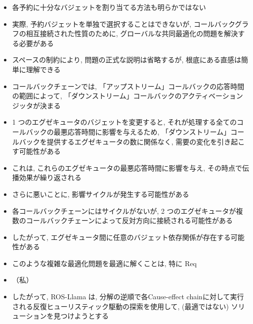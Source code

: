 \begin{frame}{}
    \begin{itemize}
        \item 各予約に十分なバジェットを割り当てる方法も明らかではない
\item 実際, 予約バジェットを単独で選択することはできないが, コールバックグラフの相互接続された性質のために, グローバルな共同最適化の問題を解決する必要がある
\item スペースの制約により, 問題の正式な説明は省略するが, 根底にある直感は簡単に理解できる
\item コールバックチェーンでは, 「アップストリーム」コールバックの応答時間の範囲によって, 「ダウンストリーム」コールバックのアクティベーションジッタが決まる
    \end{itemize}
\end{frame}

\begin{frame}{}
    \begin{itemize}
        \item 1 つのエグゼキュータのバジェットを変更すると, それが処理する全てのコールバックの最悪応答時間に影響を与えるため, 「ダウンストリーム」コールバックを提供するエグゼキュータの数に関係なく, 需要の変化を引き起こす可能性がある
\item これは, これらのエグゼキュータの最悪応答時間に影響を与え, その時点で伝播効果が繰り返される
\item さらに悪いことに, 影響サイクルが発生する可能性がある
\item 各コールバックチェーンにはサイクルがないが, 2 つのエグゼキュータが複数のコールバックチェーンによって反対方向に接続される可能性がある
    \end{itemize}
\end{frame}

\begin{frame}{}
    \begin{itemize}
        \item したがって, エグゼキュータ間に任意のバジェット依存関係が存在する可能性がある
\item このような複雑な最適化問題を最適に解くことは, 特に Req
\item （私）
\item したがって, ROS-Llama は, 分解の逆順で各Cause-effect chainに対して実行される反復ヒューリスティック駆動の探索を使用して, (最適ではない) ソリューションを見つけようとする
    \end{itemize}
\end{frame}

